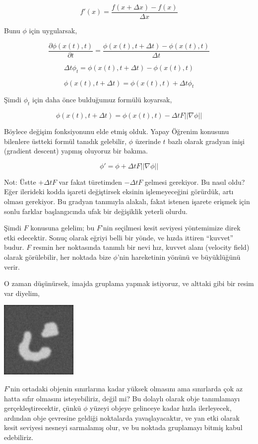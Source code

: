 \documentclass[12pt,fleqn]{article}\usepackage{../../common}
\begin{document}
$$
f'(x) = \frac{f(x+\Delta x) - f(x)}{\Delta x}
$$

Bunu $\phi$ için uygularsak,

$$
\frac{\partial \phi(x(t),t)}{\partial t} =
\frac{\phi(x(t),t+\Delta t) - \phi(x(t),t)}{\Delta t}
$$

$$
\Delta t \phi_t = \phi(x(t),t+\Delta t) - \phi(x(t),t)
$$

$$
\phi(x(t),t+\Delta t) = \phi(x(t),t) + \Delta t \phi_t
$$

Şimdi $\phi_t$ için daha önce bulduğumuz formülü koyarsak,

$$
\phi(x(t),t+\Delta t) = \phi(x(t),t) - \Delta t F ||\nabla \phi|| 
$$

Böylece değişim fonksiyonunu elde etmiş olduk. Yapay Öğrenim konusunu
bilenlere üstteki formül tanıdık gelebilir, $\phi$ üzerinde $t$ bazlı
olarak gradyan inişi (gradient descent) yapmış oluyoruz bir bakıma.

$$
\phi' = \phi + \Delta t F ||\nabla \phi ||
$$

Not: Üstte $+\Delta t F$ var fakat türetimden $-\Delta t F$ gelmesi
gerekiyor. Bu nasıl oldu?  Eğer ilerideki kodda işareti değiştirsek eksinin
işlemeyeceğini görürdük, artı olması gerekiyor. Bu gradyan tanımıyla alakalı,
fakat istenen işarete erişmek için sonlu farklar başlangıcında ufak bir
değişiklik yeterli olurdu. 

Şimdi $F$ konusuna gelelim; bu $F$'nin seçilmesi kesit seviyesi yöntemimize
direk etki edecektir. Sonuç olarak eğriyi belli bir yönde, ve hızda ittiren
``kuvvet'' budur. $F$ resmin her noktasında tanımlı bir nevi hız, kuvvet
alanı (velocity field) olarak görülebilir, her noktada bize $\phi$'nin
hareketinin yönünü ve büyüklüğünü verir.

O zaman düşünürsek, imajda gruplama yapmak istiyoruz, ve alttaki gibi bir resim
var diyelim,

\includegraphics[width=10em]{twoObj.png}

$F$'nin ortadaki objenin sınırlarına kadar yüksek olmasını ama sınırlarda çok az
hatta sıfır olmasını isteyebiliriz, değil mi? Bu dolaylı olarak obje tanımlamayı
gerçekleştirecektir, çünkü $\phi$ yüzeyi objeye gelinceye kadar hızla
ilerleyecek, ardından obje çevresine geldiği noktalarda yavaşlayacaktır, ve yan
etki olarak kesit seviyesi nesneyi sarmalamış olur, ve bu noktada gruplamayı
bitmiş kabul edebiliriz.
\end{document}
